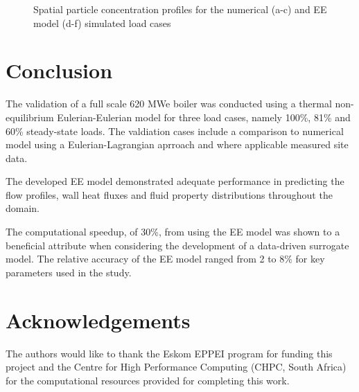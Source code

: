 \documentclass{webofc}
\begin{document}
\begin{figure}[h!]
\setlength{\belowcaptionskip}{0pt} 
\caption{Spatial particle concentration profiles for the numerical (a-c) and EE model (d-f) simulated load cases}
\label{fig_concentration}
\end{figure}

\section{Conclusion}
The validation of a full scale 620 MWe boiler was conducted using a thermal non-equilibrium Eulerian-Eulerian model for three load cases, namely 100\%, 81\% and 60\% steady-state loads. The valdiation cases include a comparison to numerical model using a Eulerian-Lagrangian aprroach and where applicable measured site data.

The developed EE model demonstrated adequate performance in predicting the flow profiles, wall heat fluxes and fluid property distributions throughout the domain.

The computational speedup, of 30\%, from using the EE model was shown to a beneficial attribute when considering the development of a data-driven surrogate model. The relative accuracy of the EE model ranged from 2 to 8\% for key parameters used in the study.

\section*{Acknowledgements}
The authors would like to thank the Eskom EPPEI program for funding this project and the Centre for High Performance Computing (CHPC, South Africa) for the computational resources provided for completing this work.

%
% 
%
%
\newpage
\end{document}
